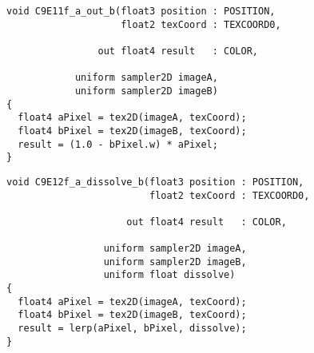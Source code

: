 \documentclass[../main.tex]{subfiles}
\begin{document}
\begin{lstlisting}[caption=Example 9-11. The \textbf{C9E11f_a_out_b} Fragment Program]
void C9E11f_a_out_b(float3 position : POSITION,
                    float2 texCoord : TEXCOORD0,

                out float4 result   : COLOR,

            uniform sampler2D imageA,
            uniform sampler2D imageB)
{
  float4 aPixel = tex2D(imageA, texCoord);
  float4 bPixel = tex2D(imageB, texCoord);
  result = (1.0 - bPixel.w) * aPixel;
}
\end{lstlisting}

\begin{lstlisting}[caption=Example 9-12. The \textbf{C9E12f_a_dissolve_b} Fragment Program]
void C9E12f_a_dissolve_b(float3 position : POSITION,
                         float2 texCoord : TEXCOORD0,

                     out float4 result   : COLOR,

                 uniform sampler2D imageA,
                 uniform sampler2D imageB,
                 uniform float dissolve)
{
  float4 aPixel = tex2D(imageA, texCoord);
  float4 bPixel = tex2D(imageB, texCoord);
  result = lerp(aPixel, bPixel, dissolve);
}
\end{lstlisting}
\end{document}
